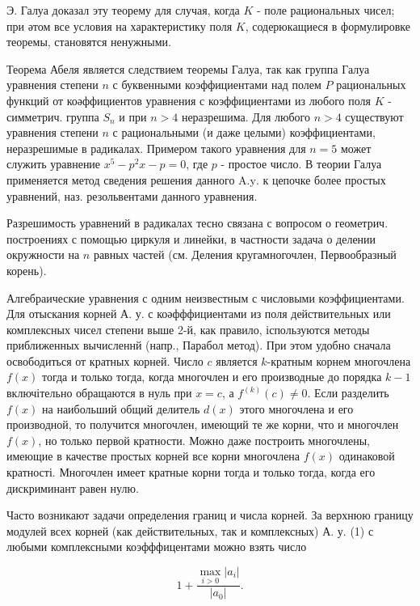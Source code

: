 \documentclass[10pt]{article}
\begin{document}
Э. Галуа доказал эту теорему для случая, когда $K$ - поле рациональных чисел; при әтом все условия на характеристику поля $K$, содерюкащиеся в формулировке теоремы, становятся ненужными.



Теорема Абеля является следствием теоремы Галуа, так как группа Галуа уравнения степени $n$ с буквенными коэффициентами над полем $P$ рациональных функций от коәффициентов уравнения с коэффициентами из любого поля $K$ - симметрич. группа $S_{n}$ и при $n>4$ неразрешима. Для любого $n>4$ существуют уравнения степени $n$ с рациональными (и даже целыми) коэффициентами, неразрешимые в радикалах. Примером такого уравнения для $n=5$ может служить уравнение $x^{5}-p^{2} x-p=0$, где $p$ - простое число. В теории Галуа применяется метод сведения решения данного $\mathrm{A} . \mathrm{y}$. к цепочке более простых уравнений, наз. резольвентами данного уравнения.



Разрешимость уравнений в радикалах тесно связана с вопросом о геометрич. построениях с помощью циркуля и линейки, в частности задача о делении окружности на $n$ равных частей (см. Деления кругамногочлен, Первообразный корень).



Алгебраические уравнения с одним неизвестным с числовыми коэффициентами. Для отыскания корней А. у. с коәфффициентами из поля действительных или комплексных чисел степени выше 2-й, как правило, іспользуются методы приближенных вычисленнй (напр., Парабол метод). При этом удобно сначала освободиться от кратных корней. Число $c$ является $k$-кратным корнем многочлена $f(x)$ тогда и только тогда, когда многочлен и его производные до порядка $k-1$ включітельно обращаются в нуль при $x=c$, а $f^{(k)}(c) \neq 0$. Если разделить $f(x)$ на наибольший общий делитель $d(x)$ этого многочлена и его производной, то получится многочлен, имеющий те же корни, что и многочлен $f(x)$, но только первой кратности. Можно даже построить многочлены, имеющие в качестве простых корней все корни многочлена $f(x)$ одинаковой кратності. Многочлен имеет кратные корни тогда и только тогда, когда его дискриминант равен нулю.



Часто возникают задачи определения границ и числа корней. За верхнюю границу модулей всех корней (как действительных, так и комплексных) А. у. (1) с любыми комплексными коэфффицентами можно взять число



\[

1+\frac{\max _{i>0}\left|a_{i}\right|}{\left|a_{0}\right|} .

\]
\end{document}
